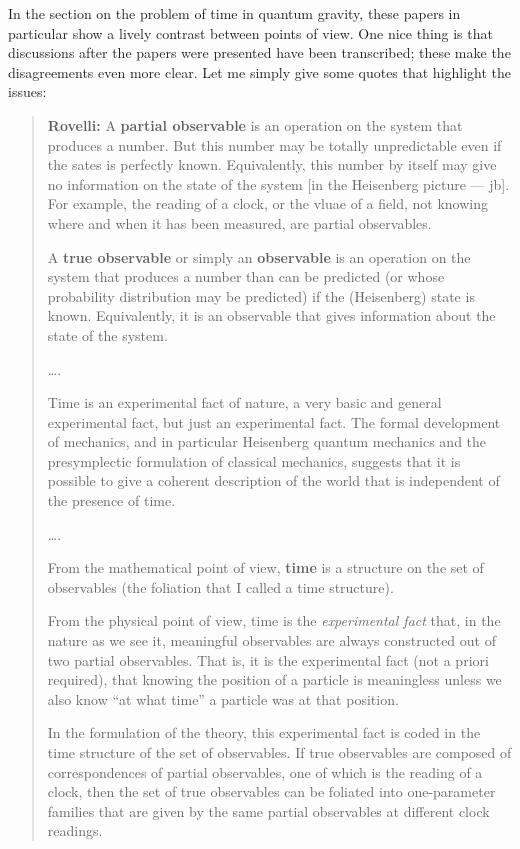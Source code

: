 \documentclass{article}
\begin{document}
In the section on the problem of time in quantum gravity, these papers
in particular show a lively contrast between points of view. One nice
thing is that discussions after the papers were presented have been
transcribed; these make the disagreements even more clear. Let me simply
give some quotes that highlight the issues:

\begin{quote}
\textbf{Rovelli:} A \textbf{partial observable} is an operation on the
system that produces a number. But this number may be totally
unpredictable even if the sates is perfectly known. Equivalently, this
number by itself may give no information on the state of the system
{[}in the Heisenberg picture --- jb{]}. For example, the reading of a
clock, or the vluae of a field, not knowing where and when it has been
measured, are partial observables.

A \textbf{true observable} or simply an \textbf{observable} is an
operation on the system that produces a number than can be predicted (or
whose probability distribution may be predicted) if the (Heisenberg)
state is known. Equivalently, it is an observable that gives information
about the state of the system.

\ldots.

Time is an experimental fact of nature, a very basic and general
experimental fact, but just an experimental fact. The formal development
of mechanics, and in particular Heisenberg quantum mechanics and the
presymplectic formulation of classical mechanics, suggests that it is
possible to give a coherent description of the world that is independent
of the presence of time.

\ldots.

From the mathematical point of view, \textbf{time} is a structure on the
set of observables (the foliation that I called a time structure).

From the physical point of view, time is the \emph{experimental fact}
that, in the nature as we see it, meaningful observables are always
constructed out of two partial observables. That is, it is the
experimental fact (not a priori required), that knowing the position of
a particle is meaningless unless we also know ``at what time'' a
particle was at that position.

In the formulation of the theory, this experimental fact is coded in the
time structure of the set of observables. If true observables are
composed of correspondences of partial observables, one of which is the
reading of a clock, then the set of true observables can be foliated
into one-parameter families that are given by the same partial
observables at different clock readings.


\end{quote}
\end{document}
